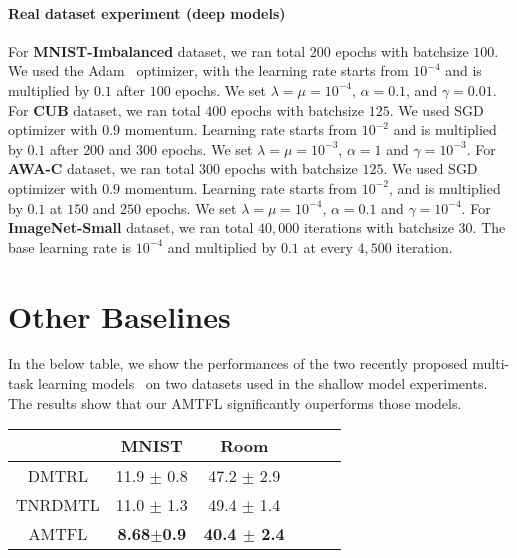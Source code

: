 \documentclass{article}
\begin{document}
\paragraph {Real dataset experiment (deep models)}
For \textbf{MNIST-Imbalanced} dataset, we ran total $200$ epochs with batchsize $100$. We used the Adam~\cite{adam} optimizer, with the learning rate starts from $10^{-4}$ and is multiplied by $0.1$ after $100$ epochs. We set $\lambda = \mu = 10^{-4}$, $\alpha=0.1$, and $\gamma=0.01$.
For \textbf{CUB} dataset, we ran total $400$ epochs with batchsize $125$. We used SGD optimizer with $0.9$ momentum. Learning rate starts from $10^{-2}$ and is multiplied by $0.1$ after $200$ and $300$ epochs. We set $\lambda = \mu = 10^{-3}$, $\alpha=1$ and $\gamma=10^{-3}$.
For \textbf{AWA-C} dataset, we ran total $300$ epochs with batchsize $125$. We used SGD
optimizer with $0.9$ momentum. Learning rate starts from $10^{-2}$, and is multiplied by $0.1$ at $150$ and $250$ epochs. We set $\lambda = \mu = 10^{-4}$, $\alpha=0.1$ and $\gamma=10^{-4}$.
For \textbf{ImageNet-Small} dataset, we ran total $40,000$ iterations with batchsize $30$. The base learning rate is $10^{-4}$ and multiplied by $0.1$ at every $4,500$ iteration. 

\section{Other Baselines}
In the below table, we show the performances of the two recently proposed multi-task learning models~\cite{dmtrl,tnrdmtl} on two datasets used in the shallow model experiments. The results show that our AMTFL significantly ouperforms those models.
\begin{table}[h]
	\small
	\vspace{-0.15in}
	\label{tabel:other_baselines}
	\begin{center}
		\begin{tabular}{cccccc}
			& MNIST & Room \\
			\hline
			\hline
			DMTRL   & 11.9 $\pm$ 0.8 & 47.2 $\pm$ 2.9 \\
			TNRDMTL & 11.0 $\pm$ 1.3 & 49.4 $\pm$ 1.4  \\			
			\hline
			AMTFL & \bf8.68$\pm$0.9& \bf 40.4 $\pm$ 2.4 \\
			\hline
		\end{tabular}
	\end{center}
	\vskip -0.1in
	\vspace{-0.15in}
\end{table}
\end{document}

